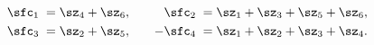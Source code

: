 \begin{equation}
\begin{aligned}
\sfc_1\;=\;& \sz_4+\sz_6,\\
\sfc_3\;=\;& \sz_2+\sz_5,
\end{aligned}\qquad\begin{aligned}
\sfc_2\;=\;& \sz_1+\sz_3+\sz_5+\sz_6,\\
-\sfc_4\;=\;& \sz_1+\sz_2+\sz_3+\sz_4.
\end{aligned}
\end{equation}

